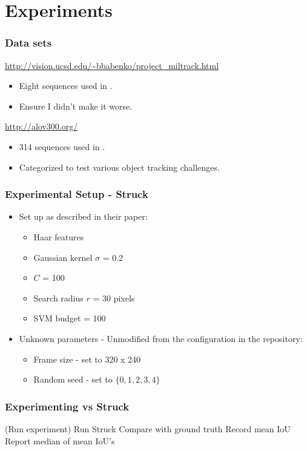 \section{Experiments}

\begin{frame}
    \frametitle{Data sets}
    \url{http://vision.ucsd.edu/~bbabenko/project_miltrack.html}
    \begin{itemize}
        \item Eight sequences used in \cite{6126251}.
        \item Ensure I didn't make it worse.
    \end{itemize}
    \url{http://alov300.org/}
    \begin{itemize}
        \item 314 sequences used in \cite{6671560}.
        \item Categorized to test various object tracking challenges.
    \end{itemize}
\end{frame}

\begin{frame}
    \frametitle{Experimental Setup - Struck}
    \begin{itemize}
        \item Set up as described in their paper:
            \begin{itemize}
                \item Haar features
                \item Gaussian kernel \(\sigma\) = 0.2
                \item \(C\) = 100
                \item Search radius \(r\) = 30 pixels
                \item SVM budget = 100
            \end{itemize}
        \item Unknown parameters - Unmodified from the configuration in the repository:
            \begin{itemize}
                \item Frame size - set to 320 x 240
                \item Random seed - set to \(\{0, 1, 2, 3, 4 \}\)
            \end{itemize}
    \end{itemize}
\end{frame}

\begin{frame}
    \frametitle{Experimenting vs Struck}
    \begin{algorithm}[H]
        \DontPrintSemicolon
        \Begin(Run experiment)
        {
            {
                {
                    Run Struck\;
                    Compare with ground truth\;
                    Record mean IoU\;
                }
                Report median of mean IoU's\;
            }
        }
    \end{algorithm}
\end{frame}

